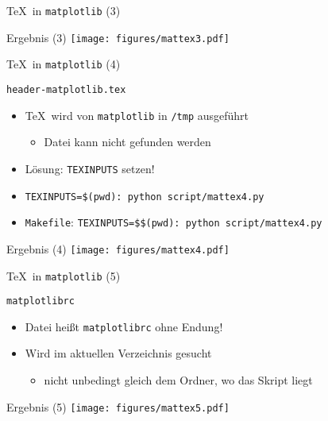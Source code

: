 \begin{frame}[fragile]{\TeX\ in \texttt{matplotlib} (3)}
\end{frame}

\AddToShipoutPictureFG*{\ShowFramePicture}
\begin{frame}{Ergebnis (3)}
  \centering
  \texttt{[image: figures/mattex3.pdf]}
\end{frame}

\begin{frame}[fragile]{\TeX\ in \texttt{matplotlib} (4)}
\end{frame}

\begin{frame}[fragile]{\texttt{header-matplotlib.tex}}
  

  \vspace*{-0.5em}
  \begin{itemize}
    \item \TeX\ wird von \texttt{matplotlib} in \texttt{/tmp} ausgeführt
      \begin{itemize}
        \item Datei kann nicht gefunden werden
      \end{itemize}
    \item Lösung: \texttt{TEXINPUTS} setzen!
    \item \texttt{TEXINPUTS=\$(pwd): python script/mattex4.py}
    \item \texttt{Makefile}: \texttt{TEXINPUTS=\$\$(pwd): python script/mattex4.py}
  \end{itemize}
  \vspace*{-1em}
\end{frame}

\AddToShipoutPictureFG*{\ShowFramePicture}
\begin{frame}{Ergebnis (4)}
  \centering
  \texttt{[image: figures/mattex4.pdf]}
\end{frame}

\begin{frame}[fragile]{\TeX\ in \texttt{matplotlib} (5)}
\end{frame}

\begin{frame}[fragile]{\texttt{matplotlibrc}}
  \lstMatplotlibrcSettings
  

  \begin{itemize}
    \item Datei heißt \texttt{matplotlibrc} ohne Endung!
    \item Wird im aktuellen Verzeichnis gesucht
      \begin{itemize}
        \item nicht unbedingt gleich dem Ordner, wo das Skript liegt
      \end{itemize}
  \end{itemize}
\end{frame}

\AddToShipoutPictureFG*{\ShowFramePicture}
\begin{frame}{Ergebnis (5)}
  \centering
  \texttt{[image: figures/mattex5.pdf]}
\end{frame}
